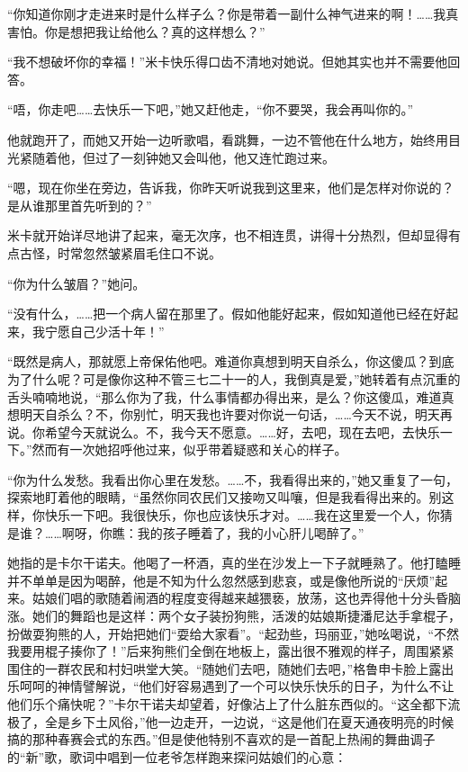 \par “你知道你刚才走进来时是什么样子么？你是带着一副什么神气进来的啊！……我真害怕。你是想把我让给他么？真的这样想么？”
\par “我不想破坏你的幸福！”米卡快乐得口齿不清地对她说。但她其实也并不需要他回答。
\par “唔，你走吧……去快乐一下吧，”她又赶他走，“你不要哭，我会再叫你的。”
\par 他就跑开了，而她又开始一边听歌唱，看跳舞，一边不管他在什么地方，始终用目光紧随着他，但过了一刻钟她又会叫他，他又连忙跑过来。
\par “嗯，现在你坐在旁边，告诉我，你昨天听说我到这里来，他们是怎样对你说的？是从谁那里首先听到的？”
\par 米卡就开始详尽地讲了起来，毫无次序，也不相连贯，讲得十分热烈，但却显得有点古怪，时常忽然皱紧眉毛住口不说。
\par “你为什么皱眉？”她问。
\par “没有什么，……把一个病人留在那里了。假如他能好起来，假如知道他已经在好起来，我宁愿自己少活十年！”
\par “既然是病人，那就愿上帝保佑他吧。难道你真想到明天自杀么，你这傻瓜？到底为了什么呢？可是像你这种不管三七二十一的人，我倒真是爱，”她转着有点沉重的舌头喃喃地说，“那么你为了我，什么事情都办得出来，是么？你这傻瓜，难道真想明天自杀么？不，你别忙，明天我也许要对你说一句话，……今天不说，明天再说。你希望今天就说么。不，我今天不愿意。……好，去吧，现在去吧，去快乐一下。”然而有一次她招呼他过来，似乎带着疑惑和关心的样子。
\par “你为什么发愁。我看出你心里在发愁。……不，我看得出来的，”她又重复了一句，探索地盯着他的眼睛，“虽然你同农民们又接吻又叫嚷，但是我看得出来的。别这样，你快乐一下吧。我很快乐，你也应该快乐才对。……我在这里爱一个人，你猜是谁？……啊呀，你瞧：我的孩子睡着了，我的小心肝儿喝醉了。”
\par 她指的是卡尔干诺夫。他喝了一杯酒，真的坐在沙发上一下子就睡熟了。他打瞌睡并不单单是因为喝醉，他是不知为什么忽然感到悲哀，或是像他所说的“厌烦”起来。姑娘们唱的歌随着闹酒的程度变得越来越猥亵，放荡，这也弄得他十分头昏脑涨。她们的舞蹈也是这样：两个女子装扮狗熊，活泼的姑娘斯捷潘尼达手拿棍子，扮做耍狗熊的人，开始把她们“耍给大家看”。“起劲些，玛丽亚，”她吆喝说，“不然我要用棍子揍你了！”后来狗熊们全倒在地板上，露出很不雅观的样子，周围紧紧围住的一群农民和村妇哄堂大笑。“随她们去吧，随她们去吧，”格鲁申卡脸上露出乐呵呵的神情譬解说，“他们好容易遇到了一个可以快乐快乐的日子，为什么不让他们乐个痛快呢？”卡尔干诺夫却望着，好像沾上了什么脏东西似的。“这全都下流极了，全是乡下土风俗，”他一边走开，一边说，“这是他们在夏天通夜明亮的时候搞的那种春赛会式的东西。”但是使他特别不喜欢的是一首配上热闹的舞曲调子的“新”歌，歌词中唱到一位老爷怎样跑来探问姑娘们的心意：
